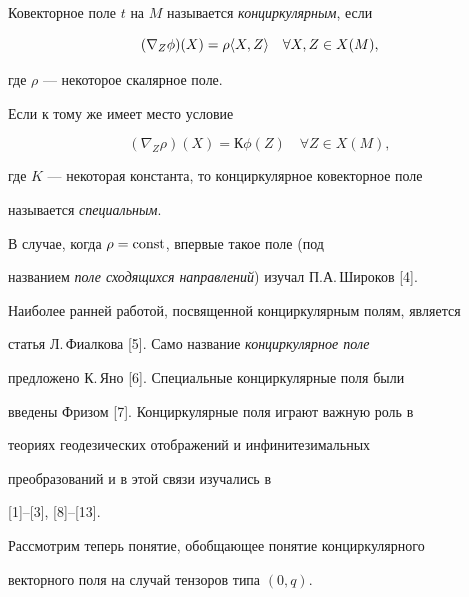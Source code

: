 \begin{defn}


Ковекторное поле $t$ на $M$ называется {\it конциркулярным}, если


\begin{equation}


(\nabla_{Z}\phi)(X)=\rho \la X,Z\ra \quad \forall X,Z\in X(M),


\end{equation}


где $\rho$ --- некоторое скалярное поле.





Если к тому же имеет место условие


\begin{equation}


(\nabla_{Z}\rho)(X)=К\phi (Z) \quad \forall Z\in X(M),\tag{1a}


\end{equation}


где $K$ --- некоторая константа, то конциркулярное ковекторное поле


называется {\it специальным}.


\end{defn}





В случае, когда $\rho=\operatorname{const}$, впервые такое поле (под 


названием {\it поле сходящихся направлений}) изучал П.А.\,Широков [4]. 


Наиболее ранней работой, посвященной конциркулярным полям, является 


статья Л.\,Фиалкова [5]. Само название {\em конциркулярное поле}


предложено К.\,Яно [6]. Специальные конциркулярные поля были 


введены Фризом [7]. Конциркулярные поля играют важную роль в 


теориях геодезических отображений и инфинитезимальных 


преобразований и в этой связи изучались в


[1]--[3], [8]--[13].





Рассмотрим теперь понятие, обобщающее понятие конциркулярного 


векторного поля на случай тензоров типа $(0, q)$.





